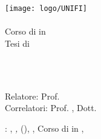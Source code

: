 \begin{titlepage}
\begin{center}

\large
\hfill
\vfill

\texttt{[image: logo/UNIFI]} \\
\myFaculty \\
Corso di \myDegreeLevel in \myDegree \\
\vspace{0.5cm}
\vspace{0.5cm}    
Tesi di \myDegreeLevel

\vfill

\begingroup
\color{Maroon}
\spacedallcaps{\myItalianTitle} \\ $\ $\\
\spacedallcaps{\myEnglishTitle} \\ 	
\bigskip
\endgroup
      
\spacedlowsmallcaps{\myName}

\vfill 
\vfill
      
Relatore: Prof. \emph{\myRelatore} \\
Correlatori: Prof. \emph{\myCorrelatore}, Dott. \emph{\myOtherCorrelatore}
      
\vfill
\vfill

\myYear

\vfill 
                     
\end{center}        
\end{titlepage} 
 
\newpage
\thispagestyle{empty}
\hfill
\vfill
\noindent
\CCBYNCSALicense: \myName, \textit{\myItalianTitle,} \myVersione (\myTime), \myUni, Corso di \myDegreeLevel in \myDegree, \myYear